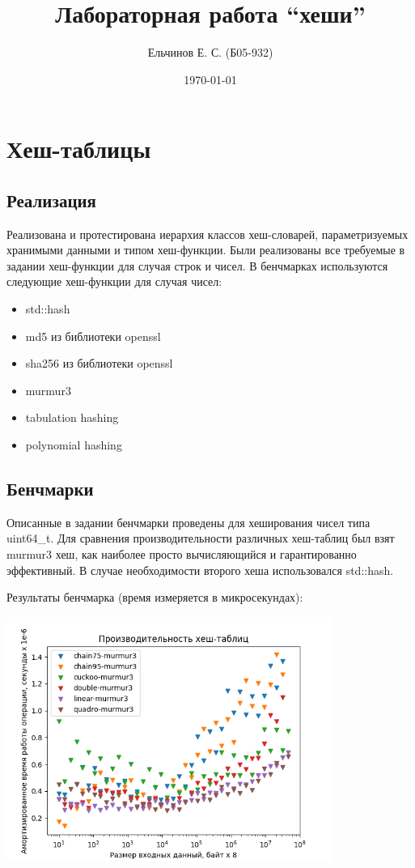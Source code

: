 \documentclass[18pt]{article}
\title{Лабораторная работа ``хеши''}
\author{Ельчинов Е. С. (Б05-932)}
\date{\today}
\begin{document}
\maketitle

\section{Хеш-таблицы}
\subsection{Реализация}
\par
Реализована и протестирована иерархия классов хеш-словарей, параметризуемых
хранимыми данными и типом хеш-функции.
Были реализованы все требуемые в задании хеш-функции для случая строк и чисел.
В бенчмарках используются следующие хеш-функции для случая чисел:
\begin{itemize}
	\item std::hash
	\item md5 из библиотеки openssl
	\item sha256 из библиотеки openssl
	\item murmur3
	\item tabulation hashing
	\item polynomial hashing
\end{itemize}

\subsection{Бенчмарки}
\par
Описанные в задании бенчмарки проведены для хеширования чисел типа uint64\_t.
Для сравнения производительности различных хеш-таблиц был взят murmur3 хеш,
как наиболее просто вычисляющийся и гарантированно эффективный.
В случае необходимости второго хеша использовался std::hash.

Результаты бенчмарка (время измеряется в микросекундах):
\begin{center}
	\includegraphics[width=0.8\textwidth]{murmur3-hash-plot.png}
\end{center}
\end{document}
